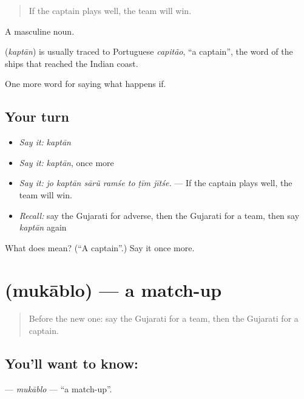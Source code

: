 \begin{quote}
If the captain plays well, the team will win.
\end{quote}

A masculine noun.

\begin{cousinweb}
\textbf{} (\emph{kaptān}) is usually traced to Portuguese \emph{capitão}, \textquotedblleft{}a captain\textquotedblright{}, the word of the ships that reached the Indian coast.
\end{cousinweb}

\begin{grammarlens}[title={What you've built}]
One more word for saying what happens if.
\end{grammarlens}

\subsection*{Your turn}
\begin{itemize}
\raggedright
  \item \emph{Say it:} \emph{kaptān}
  \item \emph{Say it:} \emph{kaptān}, once more
  \item \emph{Say it:} \emph{jo kaptān sārũ ramśe to ṭīm jītśe.} — If the captain plays well, the team will win.
  \item \emph{Recall:} say the Gujarati for adverse, then the Gujarati for a team, then say \emph{kaptān} again
\end{itemize}

\begin{tcolorbox}[breakable,colback=teal!4,colframe=teal!35!black,title={Before you move on}]
What does  mean? (\textquotedblleft{}A captain\textquotedblright{}.) Say it once more.
\end{tcolorbox}
\section[\texorpdfstring{\gu{મુકાબલો} (mukāblo)}{મુકાબલો (mukāblo)}]{ (mukāblo) — a match-up}

\label{lesson:GU-C548-mukablo}



\begin{quote}
Before the new one: say the Gujarati for a team, then the Gujarati for a captain.
\end{quote}

\subsection*{You'll want to know: }
\textbf{} — \emph{mukāblo} — \textquotedblleft{}a match-up\textquotedblright{}.

